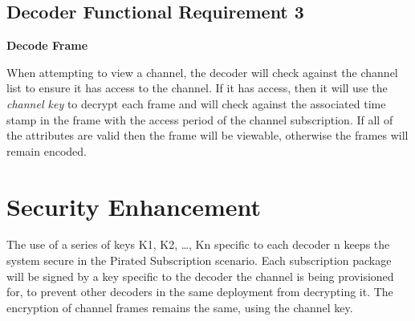 \documentclass[12pt]{article}
\begin{document}
\subsection*{Decoder Functional Requirement 3}
\textbf{Decode Frame}

When attempting to view a channel, the decoder will check against the channel list to ensure it has access to the channel. If it has access, then it will use the \textit{channel key} to decrypt each frame and will check against the associated time stamp in the frame with the access period of the channel subscription. If all of the attributes are valid then the frame will be viewable, otherwise the frames will remain encoded.

\section*{Security Enhancement}
The use of a series of keys K1, K2, \ldots, Kn specific to each decoder n keeps the system secure in the Pirated Subscription scenario. Each subscription package will be signed by a key specific to the decoder the channel is being provisioned for, to prevent other decoders in the same deployment from decrypting it. The encryption of channel frames remains the same, using the channel key.
\end{document}
